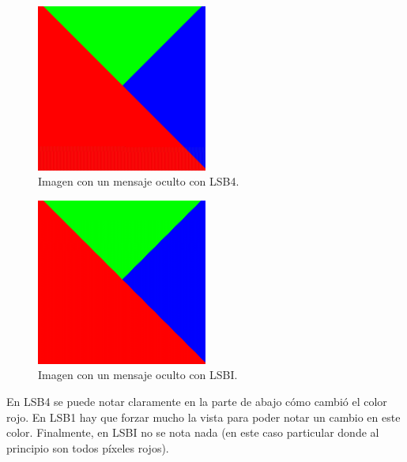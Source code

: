 \documentclass[a4paper,12pt]{article}
\def\FIG#1#2{%
	{\centering#1\par}
	#2}
\begin{document}
\begin{itemize}
		\newpage
		
		\begin{figure}[h!]%
			\FIG{\includegraphics[width=0.5\textwidth]{tricolor_lsb4.png}}
			{\caption{Imagen con un mensaje oculto con LSB4.}
				\label{fig2}}
		\end{figure}
	
		\begin{figure}[h!]%
			\FIG{\includegraphics[width=0.5\textwidth]{tricolor_lsbi.png}}
			{\caption{Imagen con un mensaje oculto con LSBI.}
				\label{fig3}}
		\end{figure}
	
	
		En LSB4 se puede notar claramente en la parte de abajo cómo cambió el color rojo. En LSB1 hay que forzar mucho la vista para poder notar un cambio en este color. Finalmente, en LSBI no se nota nada (en este caso particular donde al principio son todos píxeles rojos).
		

\end{itemize}
\end{document}
